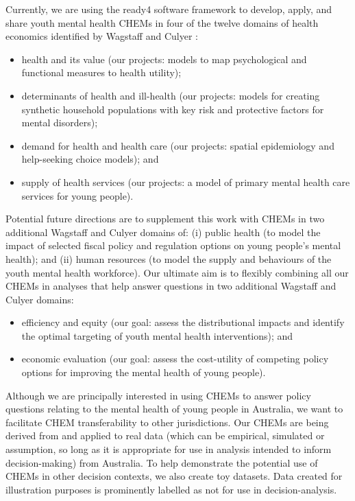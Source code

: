 \documentclass[sn-vancouver,Numbered,pdflatex]{sn-jnl}
\theoremstyle{remark}
\theoremstyle{definition}
\begin{document}
Currently, we are using the ready4 software framework to develop, apply, and share youth mental health CHEMs in four of the twelve domains of health economics identified by Wagstaff and Culyer \citep{wagstaff2012four}:

\begin{itemize}
\item
  health and its value (our projects: models to map psychological and functional measures to health utility);
\item
  determinants of health and ill-health (our projects: models for creating synthetic household populations with key risk and protective factors for mental disorders);
\item
  demand for health and health care (our projects: spatial epidemiology and help-seeking choice models); and
\item
  supply of health services (our projects: a model of primary mental health care services for young people).
\end{itemize}

Potential future directions are to supplement this work with CHEMs in two additional Wagstaff and Culyer domains of: (i) public health (to model the impact of selected fiscal policy and regulation options on young people's mental health); and (ii) human resources (to model the supply and behaviours of the youth mental health workforce). Our ultimate aim is to flexibly combining all our CHEMs in analyses that help answer questions in two additional Wagstaff and Culyer domains:

\begin{itemize}
\item
  efficiency and equity (our goal: assess the distributional impacts and identify the optimal targeting of youth mental health interventions); and
\item
  economic evaluation (our goal: assess the cost-utility of competing policy options for improving the mental health of young people).
\end{itemize}

Although we are principally interested in using CHEMs to answer policy questions relating to the mental health of young people in Australia, we want to facilitate CHEM transferability to other jurisdictions. Our CHEMs are being derived from and applied to real data (which can be empirical, simulated or assumption, so long as it is appropriate for use in analysis intended to inform decision-making) from Australia. To help demonstrate the potential use of CHEMs in other decision contexts, we also create toy datasets. Data created for illustration purposes is prominently labelled as not for use in decision-analysis.
\end{document}
